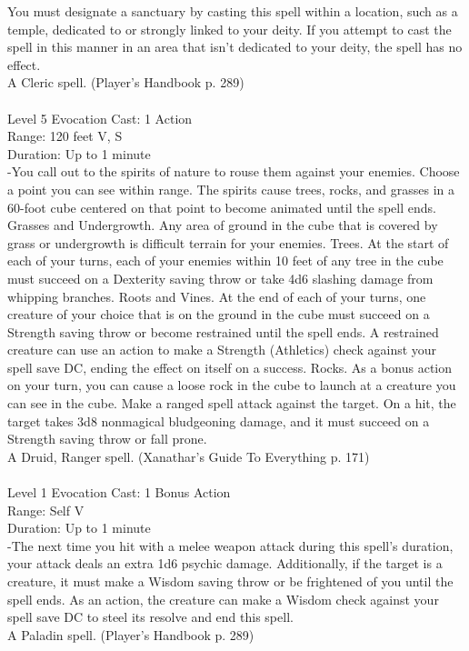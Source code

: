 \documentclass[10pt,twocolumn]{report}
\begin{document}
You must designate a sanctuary by casting this spell within a location, such as a temple, dedicated to or strongly linked to your deity. If you attempt to cast the spell in this manner in an area that isn’t dedicated to your deity, the spell has no effect.\\
A Cleric spell. (Player's Handbook p. 289) \\


 \\
Level 5 \quad Evocation \quad Cast: 1 Action\\
Range: 120 feet \quad V, S\\
Duration: Up to 1 minute \quad \\
-You call out to the spirits of nature to rouse them against your enemies. Choose a point you can see within range. The spirits cause trees, rocks, and grasses in a 60-foot cube centered on that point to become animated until the spell ends.
Grasses and Undergrowth. Any area of ground in the cube that is covered by grass or undergrowth is difficult terrain for your enemies.
Trees. At the start of each of your turns, each of your enemies within 10 feet of any tree in the cube must succeed on a Dexterity saving throw or take 4d6 slashing damage from whipping branches.
Roots and Vines. At the end of each of your turns, one creature of your choice that is on the ground in the cube must succeed on a Strength saving throw or become restrained until the spell ends. A restrained creature can use an action to make a Strength (Athletics) check against your spell save DC, ending the effect on itself on a success.
Rocks. As a bonus action on your turn, you can cause a loose rock in the cube to launch at a creature you can see in the cube. Make a ranged spell attack against the target. On a hit, the target takes 3d8 nonmagical bludgeoning damage, and it must succeed on a Strength saving throw or fall prone.\\
A Druid, Ranger spell. (Xanathar's Guide To Everything p. 171) \\


 \\
Level 1 \quad Evocation \quad Cast: 1 Bonus Action\\
Range: Self \quad V\\
Duration: Up to 1 minute \quad \\
-The next time you hit with a melee weapon attack during this spell’s duration, your attack deals an extra 1d6 psychic damage.
Additionally, if the target is a creature, it must make a Wisdom saving throw or be frightened of you until the spell ends. As an action, the creature can make a Wisdom check against your spell save DC to steel its resolve and end this spell.\\
A Paladin spell. (Player's Handbook p. 289) \\
\end{document}
